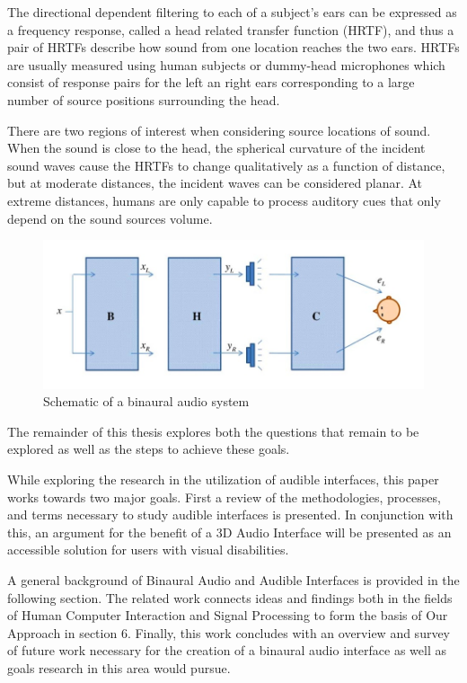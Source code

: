 The directional dependent filtering to each of a subject's ears can be expressed
as a frequency response, called a head related transfer function (HRTF), and
thus a pair of HRTFs describe how sound from one location reaches the two ears.
HRTFs are usually measured using human subjects or dummy-head microphones which
consist of response pairs for the left an right ears corresponding to a large
number of source positions surrounding the head.


There are two regions of interest when considering source locations of sound.
When the sound is close to the head, the spherical curvature of the incident
sound waves cause the HRTFs to change qualitatively as a function of distance,
but at moderate distances, the incident waves can be considered planar. At
extreme distances, humans are only capable to process auditory cues that only
depend on the sound sources volume.


\begin{figure}[h]
  \centering
  \includegraphics[width=1\textwidth]{images/binaural_diagram.jpg}
  \caption{Schematic of a binaural audio system}
\end{figure}


The remainder of this thesis explores both the questions that remain to be
explored as well as the steps to achieve these goals.


While exploring the research in the utilization of audible interfaces, this
paper works towards two major goals. First a review of the methodologies,
processes, and terms necessary to study audible interfaces is presented. In
conjunction with this, an argument for the benefit of a 3D Audio Interface will
be presented as an accessible solution for users with visual disabilities.

A general background of Binaural Audio and Audible Interfaces is provided in the
following section. The related work connects ideas and findings both in the
fields of Human Computer Interaction and Signal Processing to form the basis of
Our Approach in section 6. Finally, this work concludes with an overview and
survey of future work necessary for the creation of a binaural audio interface
as well as goals research in this area would pursue.


